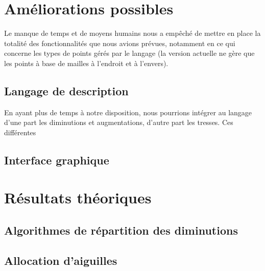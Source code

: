 \documentclass{article}
\begin{document}





\section{Améliorations possibles}

Le manque de temps et de moyens humains nous a empêché de mettre en place la totalité des fonctionnalités que nous avions prévues, notamment en ce qui concerne les 
types de points gérés par le langage (la version actuelle ne gère que les points à base de mailles à l'endroit et à l'envers).

\subsection{Langage de description}
En ayant plus de temps à notre disposition, nous pourrions intégrer au langage d'une part les diminutions et augmentations, d'autre part les tresses. Ces 
différentes 

\subsection{Interface graphique}




\section{Résultats théoriques}

\subsection{Algorithmes de répartition des diminutions}

\subsection{Allocation d'aiguilles}
\end{document}

